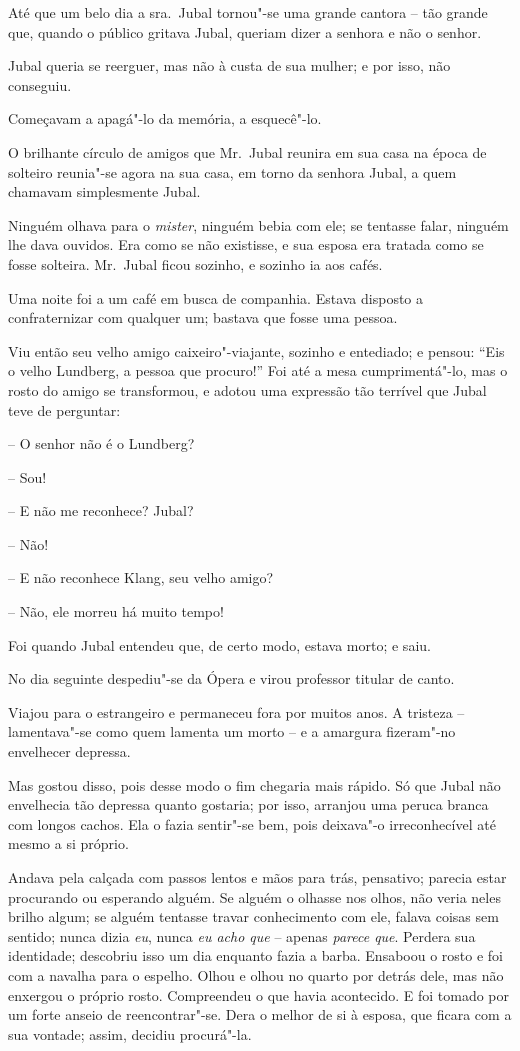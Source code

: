 Até que um belo dia a sra.~Jubal tornou"-se uma grande cantora -- tão
grande que, quando o público gritava Jubal, queriam dizer a senhora e
não o senhor.

Jubal queria se reerguer, mas não à custa de sua mulher; e por isso, não
conseguiu.

Começavam a apagá"-lo da memória, a esquecê"-lo.

O brilhante círculo de amigos que Mr.~Jubal reunira em sua casa na época
de solteiro reunia"-se agora na sua casa, em torno da senhora Jubal, a
quem chamavam simplesmente Jubal.

Ninguém olhava para o \textit{mister}, ninguém bebia com ele; se
tentasse falar, ninguém lhe dava ouvidos. Era como se não existisse, e
sua esposa era tratada como se fosse solteira. Mr.~Jubal ficou sozinho,
e sozinho ia aos cafés. 

Uma noite foi a um café em busca de companhia. Estava disposto a
confraternizar com qualquer um; bastava que fosse uma pessoa.

Viu então seu velho amigo caixeiro"-viajante, sozinho e entediado; e
pensou: ``Eis o velho Lundberg, a pessoa que procuro!'' Foi até a mesa
cumprimentá"-lo, mas o rosto do amigo se transformou, e adotou uma
expressão tão terrível que Jubal teve de perguntar:

-- O senhor não é o Lundberg?

-- Sou!

-- E não me reconhece? Jubal?

-- Não!

-- E não reconhece Klang, seu velho amigo?

-- Não, ele morreu há muito tempo!

Foi quando Jubal entendeu que, de certo modo, estava morto; e saiu.

No dia seguinte despediu"-se da Ópera e virou professor titular de
canto.

Viajou para o estrangeiro e permaneceu fora por muitos anos. A tristeza
-- lamentava"-se como quem lamenta um morto -- e a amargura fizeram"-no
envelhecer depressa.

Mas gostou disso, pois desse modo o fim chegaria mais rápido. Só que
Jubal não envelhecia tão depressa quanto gostaria; por isso, arranjou
uma peruca branca com longos cachos. Ela o fazia sentir"-se bem, pois
deixava"-o irreconhecível até mesmo a si próprio.

Andava pela calçada com passos lentos e mãos para trás, pensativo;
parecia estar procurando ou esperando alguém. Se alguém o olhasse nos
olhos, não veria neles brilho algum; se alguém tentasse travar
conhecimento com ele, falava coisas sem sentido; nunca dizia
\textit{eu}, nunca \textit{eu acho que} -- apenas \textit{parece que}.
Perdera sua identidade; descobriu isso um dia enquanto fazia a barba.
Ensaboou o rosto e foi com a navalha para o espelho. Olhou e olhou no
quarto por detrás dele, mas não enxergou o próprio rosto. Compreendeu o
que havia acontecido. E foi tomado por um forte anseio de
reencontrar"-se. Dera o melhor de si à esposa, que ficara com a sua
vontade; assim, decidiu procurá"-la.

